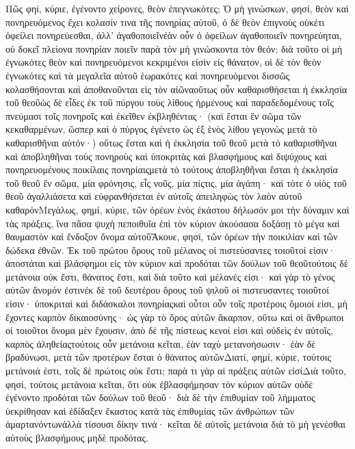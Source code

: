 Πῶς φηί, κύριε, ἐγένοντο χείρονες, θεὸν ἐπεγνωκότες; Ὁ μὴ γινώσκων, φησί, θεὸν καὶ πονηρευόμενος ἔχει κολασίν τινα τῆς πονηρίας αὐτοῦ, ὁ δὲ θεὸν ἐπιγνοὺς οὐκέτι ὀφείλει πονηρεύεσθαι, ἀλλ’ ἀγαθοποιεῖνἐὰν οὖν ὁ ὀφείλων ἀγαθοποιεῖν πονηρεύηται, οὐ δοκεῖ πλείονα πονηρίαν ποιεῖν παρὰ τὸν μὴ γινώσκοντα τὸν θεόν; διὰ τοῦτο οἱ μὴ ἐγνωκότες θεὸν καὶ πονηρευόμενοι κεκριμένοι εἰσὶν εἰς θάνατον, οἱ δὲ τὸν θεὸν ἐγνωκότες καὶ τὰ μεγαλεῖα αὐτοῦ ἑωρακότες καὶ πονηρευόμενοι δισσῶς κολασθήσονται καὶ ἀποθανοῦνται εἰς τὸν αἰῶναοὕτως οὖν καθαρισθήσεται ἡ ἐκκλησία τοῦ θεοῦὡς δὲ εἶδες ἐκ τοῦ πύργου τοὺς λίθους ἠρμένους καὶ παραδεδομένους τοῖς πνεύμασι τοῖς πονηροῖς καὶ ἐκεῖθεν ἐκβληθέντας· (καὶ ἔσται ἓν σῶμα τῶν κεκαθαρμένων, ὥσπερ καὶ ὁ πύργος ἐγένετο ὡς ἐξ ἑνὸς λίθου γεγονὼς μετὰ τὸ καθαρισθῆναι αὐτόν·) οὕτως ἔσται καὶ ἡ ἐκκλησία τοῦ θεοῦ μετὰ τὸ καθαρισθῆναι καὶ ἀποβληθῆναι τοὺς πονηροὺς καὶ ὑποκριτὰς καὶ βλασφήμους καὶ διψύχους καὶ πονηρευομένους ποικίλαις πονηρίαιςμετὰ τὸ τούτους ἀποβληθῆναι ἔσται ἡ ἐκκλησία τοῦ θεοῦ ἓν σῶμα, μία φρόνησις, εἷς νοῦς, μία πίςτις, μία ἀγάπη· καὶ τότε ὁ υἱὸς τοῦ θεοῦ ἀγαλλιάσετα καὶ εὐφρανθήσεται ἐν αὐτοῖς ἀπειληφὼς τὸν λαὸν αὐτοῦ καθαρόνΜεγάλως, φημί, κύριε, τῶν ὀρέων ἑνὸς ἑκάστου δήλωσόν μοι τὴν δύναμιν καὶ τὰς πράξεις, ἵνα πᾶσα ψυχὴ πεποιθυῖα ἐπὶ τὸν κύριον ἀκούσασα δοξάσῃ τὸ μέγα καὶ θαυμαστὸν καὶ ἔνδοξον ὄνομα αὐτοῦἌκουε, φησί, τῶν ὀρέων τὴν ποικιλίαν καὶ τῶν δώδεκα ἐθνῶν.
Ἐκ τοῦ πρώτου ὄρους τοῦ μέλανος οἱ πιστεύσαντες τοιοῦτοί εἰσιν· ἀποστάται καὶ βλάσφημοι εἰς τὸν κύριον καὶ προδόται τῶν δούλων τοῦ θεοῦτούτοις δὲ μετάνοια οὐκ ἔστι, θάνατος ἔστι, καὶ διὰ τοῦτο καὶ μέλανές εἰσι· καὶ γὰρ τὸ γένος αὐτῶν ἄνομόν ἐστινἐκ δὲ τοῦ δευτέρου ὄρους τοῦ ψιλοῦ οἱ πιστευσαντες τοιοῦτοί εἰσιν· ὑποκριταὶ καὶ διδάσκαλοι πονηρίαςκαὶ οὗτοι οὖν τοῖς προτέροις ὅμοιοί εἰσι, μὴ ἔχοντες καρπὸν δικαιοσύνης· ὡς γὰρ τὸ ὄρος αὐτῶν ἄκαρπον, οὕτω καὶ οἱ ἄνθρωποι οἱ τοιοῦτοι ὄνομα μὲν ἔχουσιν, ἀπὸ δὲ τῆς πίστεως κενοί εἰσι καὶ οὐδεὶς ἐν αὐτοῖς, καρπὸς ἀληθείαςτούτοις οὖν μετάνοια κεῖται, ἐὰν ταχὺ μετανοήσωσιν· ἐὰν δὲ βραδύνωσι, μετὰ τῶν προτέρων ἔσται ὁ θάνατος αὐτῶνΔιατί, φημί, κύριε, τούτοις μετάνοιά ἐστι, τοῖς δὲ πρώτοις οὐκ ἔστι; παρὰ τι γὰρ αἱ πράξεις αὐτῶν εἰσίΔιὰ τοῦτο, φησί, τούτοις μετάνοια κεῖται, ὅτι οὐκ ἐβλασφήμησαν τὸν κύριον αὐτῶν οὐδὲ ἐγένοντο προδόται τῶν δούλων τοῦ θεοῦ· διὰ δὲ τὴν ἐπιθυμίαν τοῦ λήμματος ὑεκρίθησαν καὶ ἐδίδαξεν ἕκαστος κατὰ τὰς ἐπιθυμίας τῶν ἀνθρώπων τῶν ἁμαρτανόντωνἀλλὰ τίσουσι δίκην τινά· κεῖται δὲ αὐτοῖς μετάνοια διὰ τὸ μὴ γενέσθαι αὐτοὺς βλασφήμους μηδὲ προδότας.
